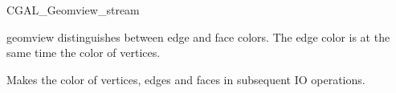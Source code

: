 \begin{ccClass}{CGAL_Geomview_stream}


geomview distinguishes between edge and face colors. The edge color
is at the same time the color of vertices. 

{Makes  the color of vertices, edges and faces in subsequent IO 
 operations.}


\end{ccClass}
